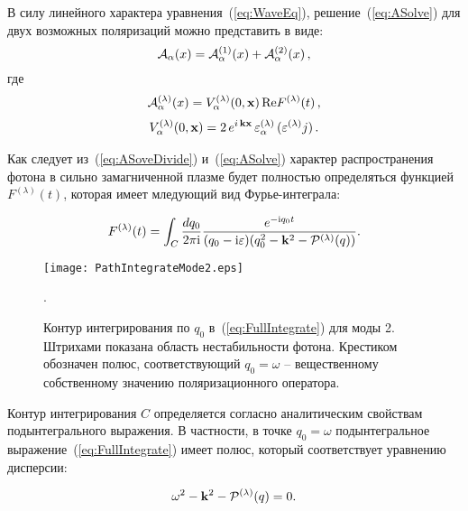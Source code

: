 В силу линейного характера уравнения~(\ref{eq:WaveEq}), решение~(\ref{eq:ASolve}) для двух возможных поляризаций можно представить в виде:
\begin{equation}\label{eq:ASoveDivide}
	{\cal A}_\alpha(x)={\cal A}^{(1)}_\alpha(x)+{\cal A}^{(2)}_\alpha(x)\, ,
\end{equation}
где 
%
\begin{eqnarray}                        		
{\cal A}^{(\lambda)}_{\alpha} (x) = V^{(\lambda)}_\alpha (0, {\bf x}) \, \text{Re} F^{(\lambda)} (t) \, ,
\label{eq:V}
\end{eqnarray}
\begin{eqnarray}
V^{(\lambda)}_\alpha (0, {\bf x}) = 2\, e^{ i\, {\bf k x}} \, 
\varepsilon^{(\lambda)}_\alpha \, (\varepsilon^{(\lambda)} j)\, .
\label{eq:partialV}
\end{eqnarray}
%

Как следует из~(\ref{eq:ASoveDivide}) и~(\ref{eq:ASolve}) характер распространения фотона в сильно замагниченной плазме будет полностью определяться функцией $F^{(\lambda)} (t)$, которая имеет мледующий вид Фурье-интеграла:

\begin{equation}\label{eq:FullIntegrate}
	F^{(\lambda)}(t)=\int_C\frac{dq_0}{2\pi \ii}\frac{e^{-\ii q_0 t}}{(q_0-\ii \varepsilon)(q_0^2-\vec{k}^2-{\cal P}^{(\lambda)}(q))}.
\end{equation}

	\begin{figure}[t]\centering
		\texttt{[image: PathIntegrateMode2.eps]}
		\caption{Контур интегрирования по $q_0$ в~(\ref{eq:FullIntegrate}) для моды 2. Штрихами показана область нестабильности фотона. Крестиком обозначен полюс, соответствующий $q_0=\omega$ -- вещественному собственному значению поляризационного оператора.}\label{fig:FullPathIntegr}.
	\end{figure}

Контур интегрирования $C$ определяется согласно аналитическим свойствам подынтегрального выражения. В частности, в точке $q_0=\omega$ подынтегральное выражение~(\ref{eq:FullIntegrate}) имеет полюс, который соответствует уравнению дисперсии:

\begin{equation}
	\omega^2 - \vec{k}^2 - {\cal P^{(\lambda)}}(q)=0.
\end{equation}

